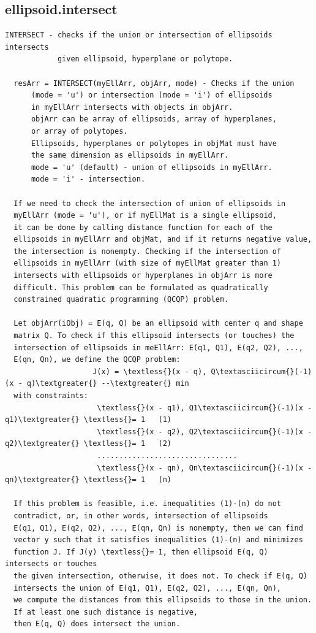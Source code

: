 \documentclass[letterpaper,10pt,english]{sphinxmanual}
\begin{document}
\subsection{ellipsoid.intersect}
\label{chap_functions:ellipsoid-intersect}
\begin{Verbatim}[commandchars=\\\{\}]
INTERSECT - checks if the union or intersection of ellipsoids intersects
            given ellipsoid, hyperplane or polytope.

  resArr = INTERSECT(myEllArr, objArr, mode) - Checks if the union
      (mode = 'u') or intersection (mode = 'i') of ellipsoids
      in myEllArr intersects with objects in objArr.
      objArr can be array of ellipsoids, array of hyperplanes,
      or array of polytopes.
      Ellipsoids, hyperplanes or polytopes in objMat must have
      the same dimension as ellipsoids in myEllArr.
      mode = 'u' (default) - union of ellipsoids in myEllArr.
      mode = 'i' - intersection.

  If we need to check the intersection of union of ellipsoids in
  myEllArr (mode = 'u'), or if myEllMat is a single ellipsoid,
  it can be done by calling distance function for each of the
  ellipsoids in myEllArr and objMat, and if it returns negative value,
  the intersection is nonempty. Checking if the intersection of
  ellipsoids in myEllArr (with size of myEllMat greater than 1)
  intersects with ellipsoids or hyperplanes in objArr is more
  difficult. This problem can be formulated as quadratically
  constrained quadratic programming (QCQP) problem.

  Let objArr(iObj) = E(q, Q) be an ellipsoid with center q and shape
  matrix Q. To check if this ellipsoid intersects (or touches) the
  intersection of ellipsoids in meEllArr: E(q1, Q1), E(q2, Q2), ...,
  E(qn, Qn), we define the QCQP problem:
                    J(x) = \textless{}(x - q), Q\textasciicircum{}(-1)(x - q)\textgreater{} --\textgreater{} min
  with constraints:
                     \textless{}(x - q1), Q1\textasciicircum{}(-1)(x - q1)\textgreater{} \textless{}= 1   (1)
                     \textless{}(x - q2), Q2\textasciicircum{}(-1)(x - q2)\textgreater{} \textless{}= 1   (2)
                     ................................
                     \textless{}(x - qn), Qn\textasciicircum{}(-1)(x - qn)\textgreater{} \textless{}= 1   (n)

  If this problem is feasible, i.e. inequalities (1)-(n) do not
  contradict, or, in other words, intersection of ellipsoids
  E(q1, Q1), E(q2, Q2), ..., E(qn, Qn) is nonempty, then we can find
  vector y such that it satisfies inequalities (1)-(n) and minimizes
  function J. If J(y) \textless{}= 1, then ellipsoid E(q, Q) intersects or touches
  the given intersection, otherwise, it does not. To check if E(q, Q)
  intersects the union of E(q1, Q1), E(q2, Q2), ..., E(qn, Qn),
  we compute the distances from this ellipsoids to those in the union.
  If at least one such distance is negative,
  then E(q, Q) does intersect the union.


\end{Verbatim}
\end{document}
